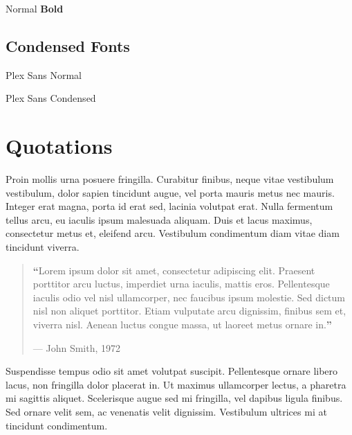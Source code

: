   Normal  \textbf{Bold}

\subsection{Condensed Fonts}

Plex Sans Normal

{\plexsanscondensed Plex Sans Condensed}


\section{Quotations}

Proin mollis urna posuere fringilla. Curabitur finibus, neque vitae vestibulum vestibulum, dolor sapien tincidunt augue, vel porta mauris metus nec mauris. Integer erat magna, porta id erat sed, lacinia volutpat erat. Nulla fermentum tellus arcu, eu iaculis ipsum malesuada aliquam. Duis et lacus maximus, consectetur metus et, eleifend arcu. Vestibulum condimentum diam vitae diam tincidunt viverra. %

\begin{quote}
  \textbf{\LARGE ``}Lorem ipsum dolor sit amet, consectetur adipiscing elit. Praesent porttitor arcu luctus, imperdiet urna iaculis, mattis eros. Pellentesque iaculis odio vel nisl ullamcorper, nec faucibus ipsum molestie. Sed dictum nisl non aliquet porttitor. Etiam vulputate arcu dignissim, finibus sem et, viverra nisl. Aenean luctus congue massa, ut laoreet metus ornare in.\textbf{''}

  \hfill--- John Smith, 1972
\end{quote}

Suspendisse tempus odio sit amet volutpat suscipit. Pellentesque ornare libero lacus, non fringilla dolor placerat in. Ut maximus ullamcorper lectus, a pharetra mi sagittis aliquet. Scelerisque augue sed mi fringilla, vel dapibus ligula finibus. Sed ornare velit sem, ac venenatis velit dignissim. Vestibulum ultrices mi at tincidunt condimentum.

